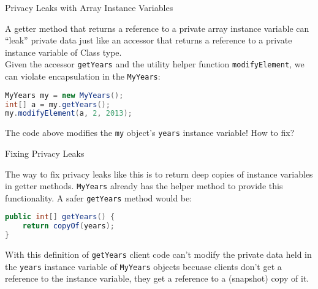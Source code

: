 \documentclass{beamer}
\begin{document}
\begin{frame}[fragile]{Privacy Leaks with Array Instance Variables}


A getter method that returns a reference to a private array instance variable can ``leak'' private data just like an accessor that returns a reference to a private instance variable of Class type.\\
\vspace{.1in}
Given the accessor {\tt getYears} and the utility helper function {\tt modifyElement}, we can violate encapsulation in the {\tt MyYears}:
\begin{lstlisting}[language=Java]
MyYears my = new MyYears();
int[] a = my.getYears();
my.modifyElement(a, 2, 2013);
\end{lstlisting}

The code above modifies the {\tt my} object's {\tt years} instance variable!  How to fix?

\end{frame}

\begin{frame}[fragile]{Fixing Privacy Leaks}


The way to fix privacy leaks like this is to return deep copies of instance variables in getter methods.  {\tt MyYears} already has the helper method to provide this functionality.  A safer {\tt getYears} method would be:
\begin{lstlisting}[language=Java]
public int[] getYears() {
    return copyOf(years);
}
\end{lstlisting}

With this definition of {\tt getYears} client code can't modify the private data held in the {\tt years} instance variable of {\tt MyYears} objects becuase clients don't get a reference to the instance variable, they get a reference to a (snapshot) copy of it.


\end{frame}
\end{document}
